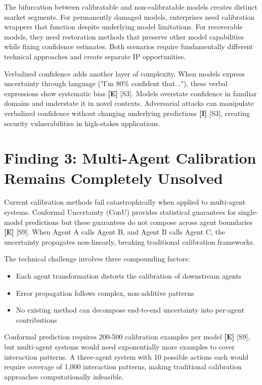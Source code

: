 \documentclass[a4paper,11pt]{article}
\newcommand{\elabel}{\textbf{\textcolor{ecolor}{[E]}}}
\newcommand{\ilabel}{\textbf{\textcolor{icolor}{[I]}}}
\begin{document}
The bifurcation between calibratable and non-calibratable models creates distinct market segments. For permanently damaged models, enterprises need calibration wrappers that function despite underlying model limitations. For recoverable models, they need restoration methods that preserve other model capabilities while fixing confidence estimates. Both scenarios require fundamentally different technical approaches and create separate IP opportunities.


Verbalized confidence adds another layer of complexity. When models express uncertainty through language ("I'm 80\% confident that..."), these verbal expressions show systematic bias \elabel{} \textcolor{primary}{[S3]}. Models overstate confidence in familiar domains and understate it in novel contexts. Adversarial attacks can manipulate verbalized confidence without changing underlying predictions \ilabel{} \textcolor{primary}{[S3]}, creating security vulnerabilities in high-stakes applications.


\section{Finding 3: Multi-Agent Calibration Remains Completely Unsolved}

Current calibration methods fail catastrophically when applied to multi-agent systems. Conformal Uncertainty (ConU) provides statistical guarantees for single-model predictions but these guarantees do not compose across agent boundaries \elabel{} \textcolor{primary}{[S9]}. When Agent A calls Agent B, and Agent B calls Agent C, the uncertainty propagates non-linearly, breaking traditional calibration frameworks.


The technical challenge involves three compounding factors:

\begin{itemize}
  \item Each agent transformation distorts the calibration of downstream agents
  \item Error propagation follows complex, non-additive patterns
  \item No existing method can decompose end-to-end uncertainty into per-agent contributions
\end{itemize}

Conformal prediction requires 200-500 calibration examples per model \elabel{} \textcolor{primary}{[S9]}, but multi-agent systems would need exponentially more examples to cover interaction patterns. A three-agent system with 10 possible actions each would require coverage of 1,000 interaction patterns, making traditional calibration approaches computationally infeasible.
\end{document}
